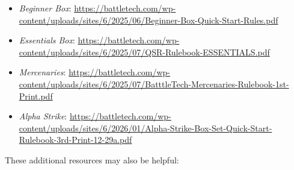 \begin{itemize}

   \item \emph{Beginner Box}: \href{https://battletech.com/wp-content/uploads/sites/6/2025/06/Beginner-Box-Quick-Start-Rules.pdf}{https://battletech.com/wp-content/uploads/sites/6/2025/06/Beginner-Box-Quick-Start-Rules.pdf}

    \item \emph{Essentials Box}: \href{https://battletech.com/wp-content/uploads/sites/6/2025/07/QSR-Rulebook-ESSENTIALS.pdf}{https://battletech.com/wp-content/uploads/sites/6/2025/07/QSR-Rulebook-ESSENTIALS.pdf}

    \item \emph{Mercenaries}: \href{https://battletech.com/wp-content/uploads/sites/6/2025/07/BatttleTech-Mercenaries-Rulebook-1st-Print.pdf}{https://battletech.com/wp-content/uploads/sites/6/2025/07/BatttleTech-Mercenaries-Rulebook-1st-Print.pdf}

    \item \emph{Alpha Strike}: \href{https://battletech.com/wp-content/uploads/sites/6/2026/01/Alpha-Strike-Box-Set-Quick-Start-Rulebook-3rd-Print-12-29a.pdf}{https://battletech.com/wp-content/uploads/sites/6/2026/01/Alpha-Strike-Box-Set-Quick-Start-Rulebook-3rd-Print-12-29a.pdf}

\end{itemize}

These additional resources may also be helpful:


